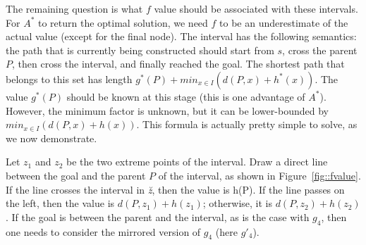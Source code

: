 
The remaining question is what $f$ value 
should be associated with these intervals.  
For $A^*$ to return the optimal solution, 
we need $f$ to be an underestimate of the actual value 
(except for the final node).  
The interval has the following semantics: 
the path that is currently being constructed 
should start from $s$, cross the parent $P$, 
then cross the interval, and finally reached the goal.  
The shortest path that belongs to this set 
has length $g^*(P) + min_{x \in I}(d(P,x) + h^*(x))$.  
The value $g^*(P)$ should be known at this stage 
(this is one advantage of $A^*$).  
However, the minimum factor is unknown, 
but it can be lower-bounded by $min_{x \in I}(d(P,x) + h(x))$.  
This formula is actually pretty simple to solve, as we now demonstrate.  

Let $z_1$ and $z_2$ be the two extreme points of the interval.  
Draw a direct line between the goal and the parent $P$ of the interval, 
as shown in Figure~\ref{fig::fvalue}.  
If the line crosses the interval in \textit{\u z}, then the value is h(P).  If the line passes on the left, 
then the value is $d(P,z_1)+h(z_1)$; 
otherwise, it is $d(P,z_2)+h(z_2)$.  
If the goal is between the parent and the interval, 
as is the case with $g_4$, 
then one needs to consider the mirrored version of $g_4$ 
(here $g'_4$).  

